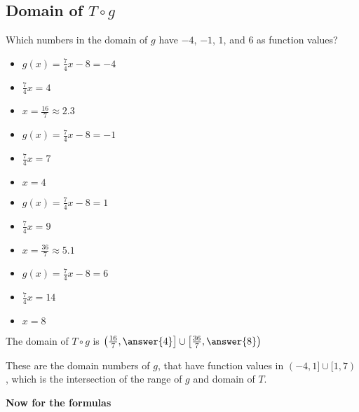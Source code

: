 \documentclass{ximera}
\begin{document}
\subsection{Domain of $T \circ g$}

Which numbers in the domain of $g$ have $-4$, $-1$, $1$, and $6$ as function values? \\


\begin{explanation}

\begin{itemize}
\item $g(x) = \frac{7}{4}x -8 = -4$
\item $\frac{7}{4}x = 4$
\item $x = \frac{16}{7} \approx 2.3$
\end{itemize}



\begin{itemize}
\item $g(x) = \frac{7}{4}x -8 = -1$
\item $\frac{7}{4}x = 7$
\item $x = 4$
\end{itemize}


\begin{itemize}
\item $g(x) = \frac{7}{4}x -8 = 1$
\item $\frac{7}{4}x = 9$
\item $x = \frac{36}{7} \approx 5.1$
\end{itemize}


\begin{itemize}
\item $g(x) = \frac{7}{4}x -8 = 6$
\item $\frac{7}{4}x = 14$
\item $x = 8$
\end{itemize}



The domain of $T \circ g$ is $\left( \frac{16}{7}, \answer{4} \right] \cup \left[ \frac{36}{7}, \answer{8} \right)$ \\


\end{explanation}

These are the domain numbers of $g$, that have function values in $(-4,1] \cup [1,7)$, which is the intersection of the range of $g$ and domain of $T$.



\textbf{Now for the formulas} \\
\end{document}
